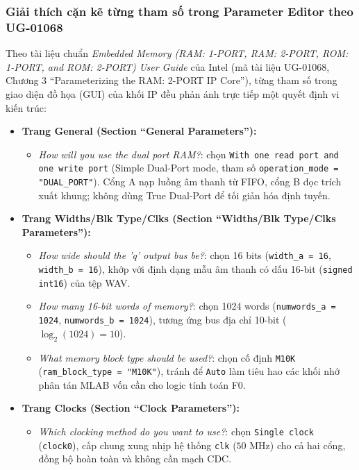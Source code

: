 \subsubsection*{Giải thích cặn kẽ từng tham số trong Parameter Editor theo UG-01068}
Theo tài liệu chuẩn \emph{Embedded Memory (RAM: 1-PORT, RAM: 2-PORT, ROM: 1-PORT, and ROM: 2-PORT) User Guide} của Intel (mã tài liệu UG-01068, Chương 3 ``Parameterizing the RAM: 2-PORT IP Core''), từng tham số trong giao diện đồ họa (GUI) của khối IP đều phản ánh trực tiếp một quyết định vi kiến trúc:
\begin{itemize}[leftmargin=1.5em, itemsep=3pt]
    \item \textbf{Trang General (Section ``General Parameters''):}
    \begin{itemize}[leftmargin=1.2em, itemsep=2pt]
        \item \emph{How will you use the dual port RAM?}: chọn \texttt{With one read port and one write port} (Simple Dual-Port mode, tham số \texttt{operation\_mode = "DUAL\_PORT"}). Cổng A nạp luồng âm thanh từ FIFO, cổng B đọc trích xuất khung; không dùng True Dual-Port để tối giản hóa định tuyến.
    \end{itemize}
    
    \item \textbf{Trang Widths/Blk Type/Clks (Section ``Widths/Blk Type/Clks Parameters''):}
    \begin{itemize}[leftmargin=1.2em, itemsep=2pt]
        \item \emph{How wide should the 'q' output bus be?}: chọn 16 bits (\texttt{width\_a = 16}, \texttt{width\_b = 16}), khớp với định dạng mẫu âm thanh có dấu 16-bit (\texttt{signed int16}) của tệp WAV.
        \item \emph{How many 16-bit words of memory?}: chọn 1024 words (\texttt{numwords\_a = 1024}, \texttt{numwords\_b = 1024}), tương ứng bus địa chỉ 10-bit ($\log_2(1024) = 10$).
        \item \emph{What memory block type should be used?}: chọn cố định \texttt{M10K} (\texttt{ram\_block\_type = "M10K"}), tránh để \texttt{Auto} làm tiêu hao các khối nhớ phân tán MLAB vốn cần cho logic tính toán F0.
    \end{itemize}
    
    \item \textbf{Trang Clocks (Section ``Clock Parameters''):}
    \begin{itemize}[leftmargin=1.2em, itemsep=2pt]
        \item \emph{Which clocking method do you want to use?}: chọn \texttt{Single clock} (\texttt{clock0}), cấp chung xung nhịp hệ thống \texttt{clk} ($50\text{ MHz}$) cho cả hai cổng, đồng bộ hoàn toàn và không cần mạch CDC.
    \end{itemize}
    

\end{itemize}
